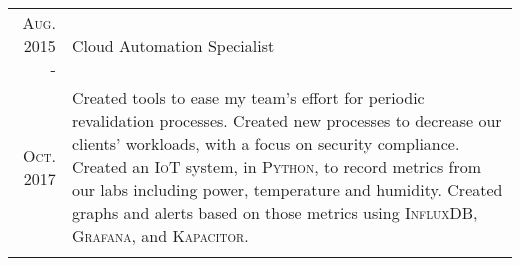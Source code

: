 \documentclass[letterpaper,10pt]{article}
\begin{document}
\begin{tabular}{R|B}
	\textsc{Aug.} 2015 -           & Cloud Automation Specialist                                                                    \\
	\textsc{Oct.} 2017\phantom{ -} & \footnotesize Created tools to ease my team's effort for periodic revalidation processes.
	Created new processes to decrease our clients' workloads, with a focus on security compliance. Created an \textsc{IoT} system,
	in \textsc{Python}, to record metrics from our labs including power, temperature and humidity. Created graphs and alerts based
	on those metrics using \textsc{InfluxDB}, \textsc{Grafana}, and \textsc{Kapacitor}.                                             \\
	                                                                                                            \\




\end{tabular}
\end{document}
